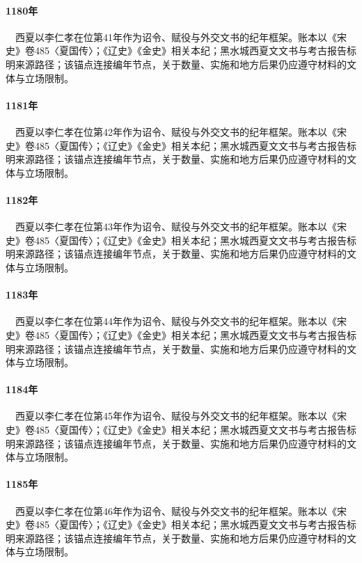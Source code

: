 \paragraph{1180年}　西夏以李仁孝在位第41年作为诏令、赋役与外交文书的纪年框架。账本以《宋史》卷485〈夏国传〉；《辽史》《金史》相关本纪；黑水城西夏文文书与考古报告标明来源路径；该锚点连接编年节点，关于数量、实施和地方后果仍应遵守材料的文体与立场限制。

\paragraph{1181年}　西夏以李仁孝在位第42年作为诏令、赋役与外交文书的纪年框架。账本以《宋史》卷485〈夏国传〉；《辽史》《金史》相关本纪；黑水城西夏文文书与考古报告标明来源路径；该锚点连接编年节点，关于数量、实施和地方后果仍应遵守材料的文体与立场限制。

\paragraph{1182年}　西夏以李仁孝在位第43年作为诏令、赋役与外交文书的纪年框架。账本以《宋史》卷485〈夏国传〉；《辽史》《金史》相关本纪；黑水城西夏文文书与考古报告标明来源路径；该锚点连接编年节点，关于数量、实施和地方后果仍应遵守材料的文体与立场限制。

\paragraph{1183年}　西夏以李仁孝在位第44年作为诏令、赋役与外交文书的纪年框架。账本以《宋史》卷485〈夏国传〉；《辽史》《金史》相关本纪；黑水城西夏文文书与考古报告标明来源路径；该锚点连接编年节点，关于数量、实施和地方后果仍应遵守材料的文体与立场限制。

\paragraph{1184年}　西夏以李仁孝在位第45年作为诏令、赋役与外交文书的纪年框架。账本以《宋史》卷485〈夏国传〉；《辽史》《金史》相关本纪；黑水城西夏文文书与考古报告标明来源路径；该锚点连接编年节点，关于数量、实施和地方后果仍应遵守材料的文体与立场限制。

\paragraph{1185年}　西夏以李仁孝在位第46年作为诏令、赋役与外交文书的纪年框架。账本以《宋史》卷485〈夏国传〉；《辽史》《金史》相关本纪；黑水城西夏文文书与考古报告标明来源路径；该锚点连接编年节点，关于数量、实施和地方后果仍应遵守材料的文体与立场限制。

